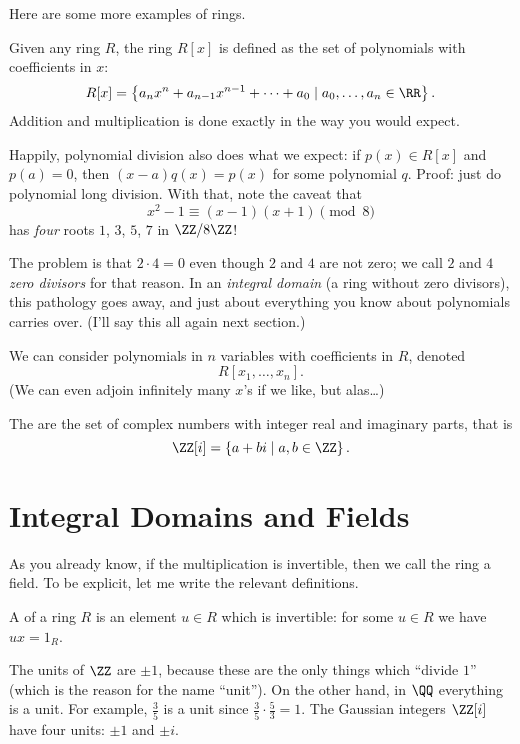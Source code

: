 Here are some more examples of rings.
\begin{example}
	Given any ring $R$, the ring $R[x]$ is defined as the set of polynomials
	with coefficients in $x$:
	\[ R[x] = \left\{ a_nx^n+a_{n-1}x^{n-1}+\dots+a_0 \mid a_0, \dots, a_n \in \RR \right\}. \]
	Addition and multiplication is done exactly in the way you would expect.
\end{example}
\begin{remark}
	[Digression] Happily, polynomial division also does what we expect: if $p(x) \in R[x]$
	and $p(a) = 0$, then $(x-a)q(x) = p(x)$ for some polynomial $q$.
	Proof: just do polynomial long division.
	With that, note the caveat that 
	\[ x^2-1 \equiv (x-1)(x+1) \pmod 8 \] has \emph{four} roots $1$, $3$, $5$, $7$ in
	$\ZZ/8\ZZ$!

	The problem is that $2 \cdot 4 = 0$ even though $2$ and $4$ are not zero;
	we call $2$ and $4$ \emph{zero divisors} for that reason.
	In an \emph{integral domain} (a ring without zero divisors), this pathology goes away,
	and just about everything you know about polynomials carries over.
	(I'll say this all again next section.)
\end{remark}
\begin{example}
	We can consider polynomials in $n$ variables with coefficients in $R$,
	denoted \[ R[x_1, \dots, x_n]. \]
	(We can even adjoin infinitely many $x$'s if we like, but alas\dots)
\end{example}
\begin{example}
	The  are the set of complex numbers
	with integer real and imaginary parts, that is
	\[ \ZZ[i] = \left\{ a+bi \mid a,b \in \ZZ \right\}. \]
\end{example}

\section{Integral Domains and Fields}

As you already know, if the multiplication is invertible,
then we call the ring a field.
To be explicit, let me write the relevant definitions.

\begin{definition}
	A  of a ring $R$
	is an element $u \in R$ which is invertible:
	for some $u \in R$ we have $ux = 1_R$.
\end{definition}
\begin{example}
	\listhack
	\begin{enumerate}[(a)]
	\ii The units of $\ZZ$ are $\pm 1$,
	because these are the only things which ``divide $1$''
	(which is the reason for the name ``unit'').
	\ii On the other hand, in $\QQ$ everything is a unit.
	For example, $\frac 35$ is a unit since $\frac 35 \cdot \frac 53 = 1$.
	\ii The Gaussian integers $\ZZ[i]$ have four units: $\pm 1$ and $\pm i$.
	\end{enumerate}
\end{example}


